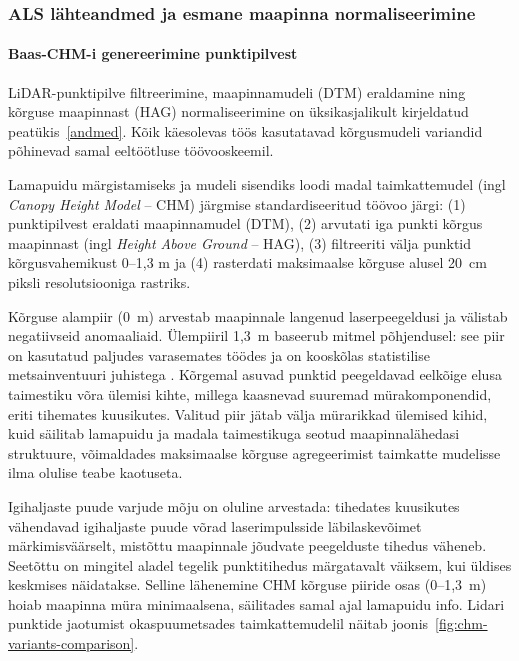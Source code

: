     \subsubsection{ALS lähteandmed ja esmane maapinna normaliseerimine}

    \paragraph{Baas-CHM-i genereerimine punktipilvest}

    LiDAR-punktipilve filtreerimine, maapinnamudeli (DTM) eraldamine ning kõrguse maapinnast (HAG) normaliseerimine on üksikasjalikult kirjeldatud peatükis~\ref{andmed}. Kõik käesolevas töös kasutatavad kõrgusmudeli variandid põhinevad samal eeltöötluse töövooskeemil.

    Lamapuidu märgistamiseks ja mudeli sisendiks loodi madal taimkattemudel (ingl \textit{Canopy Height Model} -- CHM) järgmise standardiseeritud töövoo järgi: (1) punktipilvest eraldati maapinnamudel (DTM), (2) arvutati iga punkti kõrgus maapinnast (ingl \textit{Height Above Ground} -- HAG), (3) filtreeriti välja punktid kõrgusvahemikust 0--1,3 m ja (4) rasterdati maksimaalse kõrguse alusel 20~cm piksli resolutsiooniga rastriks.

    Kõrguse alampiir (0~m) arvestab maapinnale langenud laserpeegeldusi ja välistab negatiivseid anomaaliaid. Ülempiiril 1,3~m baseerub mitmel põhjendusel: see piir on kasutatud paljudes varasemates töödes \parencite{jarron_detection_2021, joyce_detection_2019} ja on kooskõlas statistilise metsainventuuri juhistega \parencite{keskkonnaagentuur_smi_valitood_2023}. Kõrgemal asuvad punktid peegeldavad eelkõige elusa taimestiku võra ülemisi kihte, millega kaasnevad suuremad mürakomponendid, eriti tihemates kuusikutes. Valitud piir jätab välja mürarikkad ülemised kihid, kuid säilitab lamapuidu ja madala taimestikuga seotud maapinnalähedasi struktuure, võimaldades maksimaalse kõrguse agregeerimist taimkatte mudelisse ilma olulise teabe kaotuseta.

    Igihaljaste puude varjude mõju on oluline arvestada: tihedates kuusikutes vähendavad igihaljaste puude võrad laserimpulsside läbilaskevõimet märkimisväärselt, mistõttu maapinnale jõudvate peegelduste tihedus väheneb. Seetõttu on mingitel aladel tegelik punktitihedus märgatavalt väiksem, kui üldises keskmises näidatakse. Selline lähenemine CHM kõrguse piiride osas (0--1,3~m) hoiab maapinna müra minimaalsena, säilitades samal ajal lamapuidu info. Lidari punktide jaotumist okaspuumetsades taimkattemudelil näitab joonis~\ref{fig:chm-variants-comparison}.


